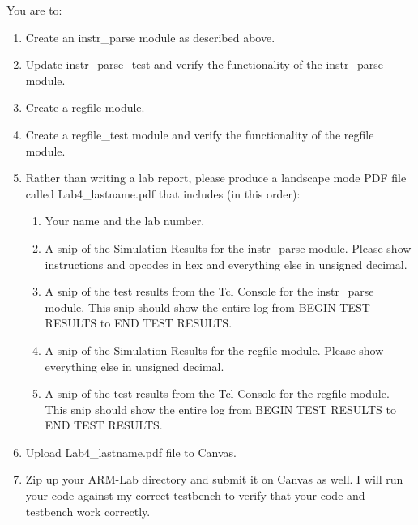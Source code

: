 You are to:
\begin{enumerate}
\item Create an instr\_parse module as described above.
\item Update instr\_parse\_test and verify the functionality of the instr\_parse module.
\item Create a regfile module.
\item Create a regfile\_test module and verify the functionality of the regfile module.
\item Rather than writing a lab report, please produce a landscape mode PDF file called Lab4\_lastname.pdf that includes (in this order):
\begin{enumerate}
	\item Your name and the lab number.
	\item A snip of the Simulation Results for the instr\_parse module.  Please show instructions and opcodes in hex and everything else in unsigned decimal.  
	\item A snip of the test results from the Tcl Console for the instr\_parse module.  This snip should show the entire log from BEGIN TEST RESULTS to END TEST RESULTS.
	\item A snip of the Simulation Results for the regfile module.  Please show everything else in unsigned decimal.  
	\item A snip of the test results from the Tcl Console for the regfile module.  This snip should show the entire log from BEGIN TEST RESULTS to END TEST RESULTS.	
\end{enumerate}
\item Upload Lab4\_lastname.pdf file to Canvas.
\item Zip up your ARM-Lab directory and submit it on Canvas as well.  I will run your code against my correct testbench to verify that your code and testbench work correctly.
\end{enumerate} 
